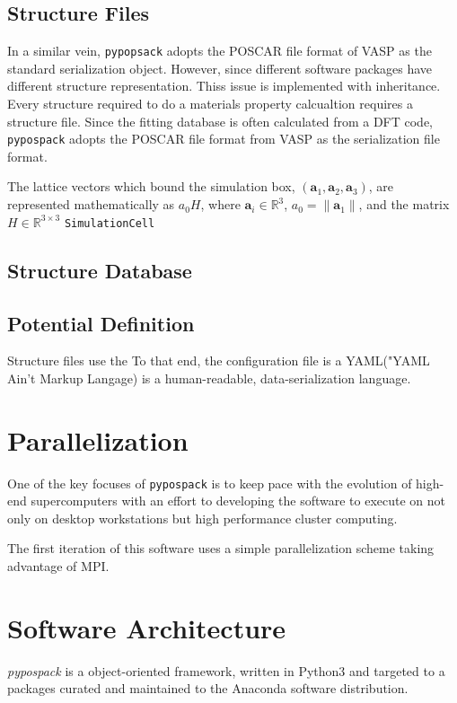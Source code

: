 \subsection{Structure Files}
In a similar vein, \verb|pypopsack| adopts the POSCAR file format of VASP as the standard serialization object.  However, since different software packages have different structure representation.  Thiss issue is implemented with inheritance.
Every structure required to do a materials property calcualtion requires a structure file.  Since the fitting database is often calculated from a DFT code, \verb|pypospack| adopts the POSCAR file format from VASP as the serialization file format.

The lattice vectors which bound the simulation box, $(\bm{a}_1,\bm{a}_2,\bm{a}_3)$,  are represented mathematically as $a_0 H$, where $\bm{a}_i \in \mathbb{R}^3$, $a_0 = \lVert\bm{a}_1\rVert$, and the matrix $H \in \mathbb{R}^{3\times3}$
\verb|SimulationCell|

\subsection{Structure Database}
\subsection{Potential Definition}

Structure files use the
To that end, the configuration file is a YAML("YAML Ain't Markup Langage) is a human-readable, data-serialization language.


\section{Parallelization}
One of the key focuses of \verb|pypospack| is to keep pace with the evolution of high-end supercomputers with an effort to developing the software to execute on not only on desktop workstations but high performance cluster computing.

The first iteration of this software uses a simple parallelization scheme taking advantage of MPI.
\section{Software Architecture}

\emph{pypospack} is a object-oriented framework, written in Python3 and targeted to a packages curated and maintained to the Anaconda software distribution.

